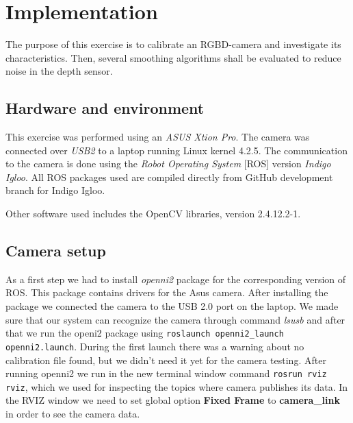\documentclass[11pt]{article}
\begin{document}
\section{Implementation}
The purpose of this exercise is to calibrate an RGBD-camera and investigate its characteristics. Then, several smoothing algorithms shall be evaluated to reduce noise in the depth sensor.

\subsection{Hardware and environment}
This exercise was performed using an \emph{ASUS Xtion Pro}. The camera was connected over \emph{USB2} to a laptop running Linux kernel 4.2.5. The communication to the camera is done using the \emph{Robot Operating System} [ROS] version \emph{Indigo Igloo}. All ROS packages used are compiled directly from GitHub development branch for Indigo Igloo. \par
Other software used includes the OpenCV libraries, version 2.4.12.2-1.

\subsection{Camera setup}
As a first step we had to install \emph{openni2} package for the corresponding version of ROS. This package contains drivers for the Asus camera. After installing the package we connected the camera to the USB 2.0 port on the laptop. We made sure that our system can recognize the camera through command \emph{lsusb} and after that we run the openi2 package using \texttt{roslaunch openni2\_launch openni2.launch}. During the first launch there was a warning about no calibration file found, but we didn't need it yet for the camera testing. After running openni2 we run in the new terminal window command \texttt{rosrun rviz rviz}, which we used for inspecting the topics where camera publishes its data. In the RVIZ window we need to set global option \textbf{Fixed Frame} to \textbf{camera\_link} in order to see the camera data. \par
\end{document}
